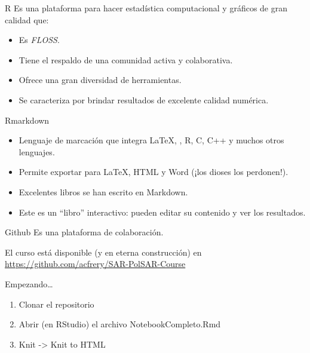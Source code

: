 \documentclass[professionalfonts,table,aspectratio=1610]{beamer}
\begin{document}
\begin{frame}{R}
Es una plataforma para hacer estadística computacional y gráficos de gran calidad que:
\begin{itemize}
\item Es \textit{FLOSS}.
\item Tiene el respaldo de una comunidad activa y colaborativa.
\item Ofrece una gran diversidad de herramientas.
\item Se caracteriza por brindar resultados de excelente calidad numérica.
\end{itemize}
\end{frame}

\begin{frame}{Rmarkdown}

\begin{itemize}
\item Lenguaje de marcación que integra \LaTeX, \BibTeX, R, C, C++ y muchos otros lenguajes.
\item Permite exportar para \LaTeX, HTML y Word (¡los dioses los perdonen!).
\item Excelentes libros se han escrito en Markdown.
\item Este es un ``libro'' interactivo: pueden editar su contenido y ver los resultados.
\end{itemize}
\end{frame}

\begin{frame}{Github}
Es una plataforma de colaboración.

El curso está disponible (y en eterna construcción) en \url{https://github.com/acfrery/SAR-PolSAR-Course}

\end{frame}

\begin{frame}{Empezando\dots}
\begin{enumerate}
\item Clonar el repositorio
\item Abrir (en RStudio) el archivo NotebookCompleto.Rmd
\item Knit -> Knit to HTML
\end{enumerate}
\end{frame}
\end{document}
